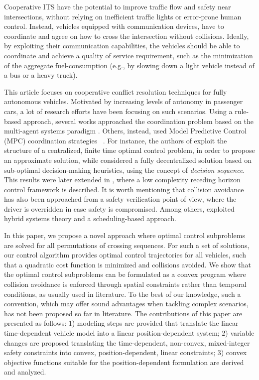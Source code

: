 \documentclass[letterpaper,10pt,conference]{ieeeconf}
\begin{document}
Cooperative ITS have the potential to improve traffic flow and safety near intersections, without relying on inefficient traffic lights or error-prone human control. Instead, vehicles equipped with communication devices, have to coordinate and agree on how to cross the intersection without collisions. Ideally, by exploiting their communication capabilities, the vehicles should be able to coordinate and achieve a quality of service requirement, such as the minimization of the aggregate fuel-consumption (e.g., by slowing down a light vehicle instead of a bus or a heavy truck).

This article focuses on cooperative conflict resolution techniques for fully autonomous vehicles.  Motivated by increasing levels of autonomy in passenger cars,  a lot of research efforts have been focusing on such scenarios. Using a rule-based approach, several works  approached the coordination problem based on the multi-agent systems paradigm \cite{dresner2004,dresner2005,dresner2008,kowshik2011}. Others, instead, used Model Predictive Control (MPC) coordination strategies ~\cite{kim2013mpc,kim2014mpc,Hult2015,Campos2013,Campos2014}. For instance, the authors of \cite{Hult2015} exploit the structure of a centralized, finite time optimal control problem, in order to propose an approximate solution, while \cite{Campos2013} considered a fully decentralized solution based on sub-optimal decision-making heuristics, using the concept of \emph{decision sequence}. This results were later extended in \cite{Campos2014}, where a low complexity receding horizon control framework is described. It is worth mentioning  that collision avoidance has also been approached from a safety verification point of view, where the driver is overridden in case  safety is compromised. Among others,   \cite{Hafner2013,Hafner2011,Hafner2011a} exploited hybrid systems theory and  \cite{Ahn2014,Bruni2013,Colombo2014,Colombo2012} a scheduling-based approach.

In this paper, we propose a novel approach where optimal control subproblems are solved for all permutations of crossing sequences. For such a set of solutions, our control algorithm provides optimal control trajectories for all vehicles, such that a quadratic cost function is minimized and collisions  avoided. We show that the optimal control subproblems can be formulated as a convex program where collision avoidance is enforced through spatial constraints rather than temporal conditions, as usually used in literature. To the best of our knowledge, such a convention, which may offer sound advantages when tackling complex scenarios, has not been proposed so far in literature. The contributions of this paper  are presented as follows: 1) modeling steps are provided that translate the linear time-dependent vehicle model into a linear position-dependent system; 2) variable changes are proposed  translating the time-dependent, non-convex, mixed-integer safety constraints into convex, position-dependent, linear constraints; 3) convex objective functions suitable for the position-dependent formulation are derived and analyzed.
\end{document}
